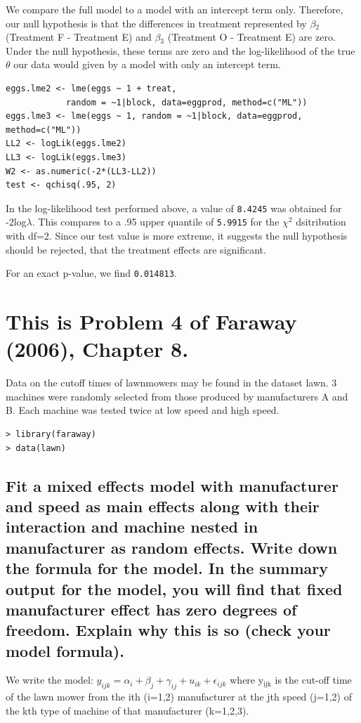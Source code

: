 \documentclass[11pt]{article}
\begin{document}
We compare the full model to a model with an intercept term only.
Therefore, our null hypothesis is that the differences in treatment 
represented by $\beta$$_2$ (Treatment F - Treatment E) and $\beta$$_3$
(Treatment O - Treatment E) are zero. Under the null hypothesis, these
terms are zero and the log-likelihood of the true $\theta$ our data
would given by a model with only an intercept term.


\begin{verbatim}
eggs.lme2 <- lme(eggs ~ 1 + treat, 
            random = ~1|block, data=eggprod, method=c("ML"))
eggs.lme3 <- lme(eggs ~ 1, random = ~1|block, data=eggprod, method=c("ML"))
LL2 <- logLik(eggs.lme2)
LL3 <- logLik(eggs.lme3)
W2 <- as.numeric(-2*(LL3-LL2))
test <- qchisq(.95, 2)
\end{verbatim}

In the log-likelihood test performed above, a value of 
\texttt{8.4245} was obtained for -2log$\lambda$. This
compares to a .95 upper quantile of \texttt{5.9915} for
the $\chi$$^2$ dsitribution with df=2. Since our test value is more extreme, it
suggests the null hypothesis should be rejected, that the treatment 
effects are significant.

For an exact p-value, we find 
\texttt{0.014813}.
\section{This is Problem 4 of Faraway (2006), Chapter 8.}
\label{sec-2}


Data on the cutoff times of lawnmowers may be found in the dataset lawn. 3 machines were
randomly selected from those produced by manufacturers A and B. Each machine was tested twice
at low speed and high speed.


\begin{verbatim}
> library(faraway)
> data(lawn)
\end{verbatim}
\subsection{Fit a mixed effects model with manufacturer and speed as main effects along with their interaction and machine nested in manufacturer as random effects. Write down the formula for the model. In the summary output for the model, you will find that fixed manufacturer effect has zero degrees of freedom. Explain why this is so (check your model formula).}
\label{sec-2-1}


We write the model: $y_{ijk} = \alpha_i + \beta_j + \gamma_{ij} +
u_{ik} + \epsilon_{ijk}$ where y$_{\mathrm{ijk}}$ is the cut-off time of the
lawn mower from the ith (i=1,2) manufacturer at the jth speed (j=1,2)
of the kth type of machine of that manufacturer (k=1,2,3). 
\end{document}
